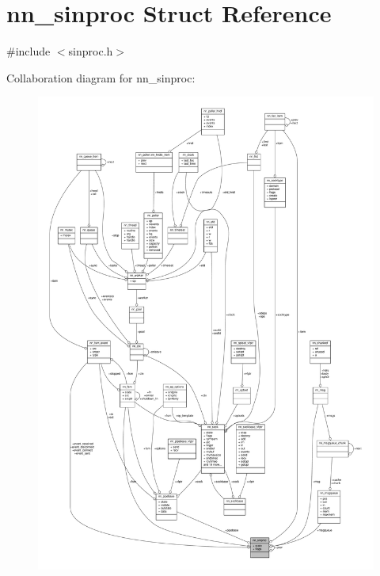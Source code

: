 \hypertarget{structnn__sinproc}{}\section{nn\+\_\+sinproc Struct Reference}
\label{structnn__sinproc}


{\ttfamily \#include $<$sinproc.\+h$>$}



Collaboration diagram for nn\+\_\+sinproc\+:\nopagebreak
\begin{figure}[H]
\begin{center}
\leavevmode
\includegraphics[width=350pt]{structnn__sinproc__coll__graph}
\end{center}
\end{figure}
